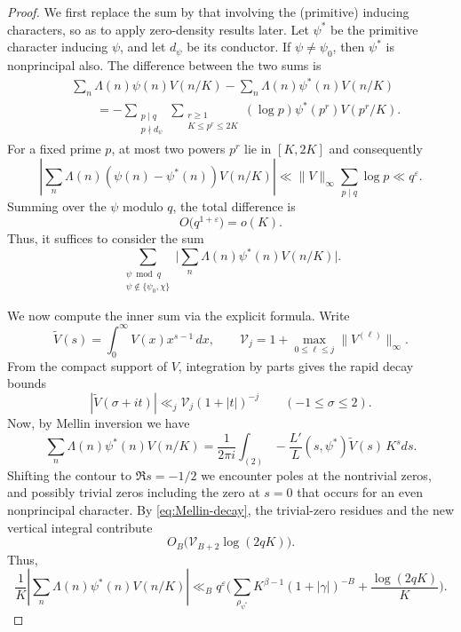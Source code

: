\documentclass[12pt, oneside]{amsart}
\theoremstyle{definition}
\newcommand{\leqs}{\leqslant }
\newcommand{\geqs}{\geqslant }
\newcommand{\eps}{\varepsilon}
\newcommand{\1}{\mathds{1}}
\begin{document}
\begin{proof}
We first replace the sum by that involving the (primitive) inducing characters, so as to apply zero-density results later. Let $\psi^*$ be the primitive character inducing $\psi$, and let
$d_\psi$ be its conductor.  If $\psi\ne\psi_0$, then $\psi^*$ is nonprincipal also. 
The difference between the two sums is 
\begin{align*}
 &\sum_n\Lambda(n)\psi(n)V(n/K)
 -\sum_n\Lambda(n)\psi^*(n)V(n/K)\\
 &\qquad=-\sum_{\substack{p\mid q\\p\nmid d_\psi}}
 \sum_{\substack{r\geqs1\\K\leqs p^r\leqs 2K}}
 (\log p)\psi^*(p^r)V(p^r/K).
\end{align*}
For a fixed prime $p$, at most two powers $p^r$ lie in $[K,2K]$ and consequently
\[
 \left|\sum_n\Lambda(n)
       (\psi(n)-\psi^*(n))V(n/K)\right|
 \ll \|V\|_\infty\sum_{p\mid q}\log p
 \ll q^{\eps}.
\]
Summing over the $\psi$ modulo $q$, the total difference is
\begin{equation*}
 O\bigl(q^{1+\eps}\bigr)=o(K).
\end{equation*}
Thus, it suffices to consider the sum
\[
 \sum_{\substack{\psi\bmod q\\\psi\notin\{\psi_0,\chi\}}}
\bigg|\sum_n\Lambda(n)\psi^*(n)V(n/K)\bigg|.
\]


We now compute the inner sum via the explicit formula. Write
\[
 \widetilde V(s)=\int_0^\infty V(x)x^{s-1}\,dx,
 \qquad
 \mathcal V_j=1+\max_{0\leqs \ell\leqs j}
                    \|V^{(\ell)}\|_\infty.
\]
From the compact support of $V$, integration by parts gives the rapid decay bounds
\begin{equation}
 |\widetilde V(\sigma+it)|
 \ll_j \mathcal V_j(1+|t|)^{-j}
 \qquad (-1\leqs\sigma\leqs2).
 \label{eq:Mellin-decay}
\end{equation}
Now, by Mellin inversion we have 
\begin{equation}
 \sum_n\Lambda(n)\psi^*(n)V(n/K)
 =\frac{1}{2\pi i}\int_{(2)}
   -\frac{L'}{L}(s,\psi^*)\widetilde V(s)\,K^sds.
 \label{eq:prime-Mellin-inversion}
\end{equation}
Shifting the contour to $\Re s=-1/2$ we encounter poles at the nontrivial zeros,
and possibly trivial zeros including the zero
at $s=0$ that occurs for an even nonprincipal character.  By
\eqref{eq:Mellin-decay}, the trivial-zero residues and the new vertical
integral contribute
\[
 O_B\bigl(\mathcal V_{B+2}\log(2qK)\bigr).
\]
Thus,
\begin{equation}
 \frac1K\left|\sum_n\Lambda(n)\psi^*(n)V(n/K)\right|
 \ll_B q^\eps
 \bigg(\sum_{\rho_{\psi^*}}
 K^{\beta-1}(1+|\gamma|)^{-B}
 +\frac{\log(2qK)}K\bigg).
 \label{eq:prime-explicit}
\end{equation}


\end{proof}
\end{document}
